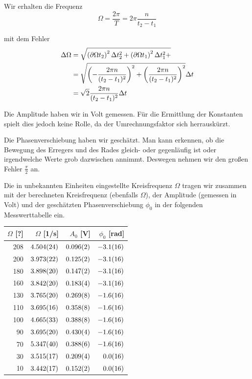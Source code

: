 \documentclass[a4paper,german,12pt,smallheadings]{scrartcl}
\begin{document}
Wir erhalten die Frequenz
\begin{equation}
  \Omega = \frac{2 \pi}{T} = 2 \pi \frac{n}{t_2 - t_1}
\end{equation}

mit dem Fehler
\begin{align}
  \Delta \Omega &= \sqrt{
    \del{\partial{\Omega}{t_2}}^2 \Delta t_2^2 +
    \del{\partial{\Omega}{t_1}}^2 \Delta t_1^2 +
  } \\
  &= \sqrt{
    \del{-\frac{2 \pi n}{(t_2 - t_1)^2}}^2 +
    \del{\frac{2 \pi n}{(t_2 - t_1)^2}}^2
  } \Delta t \\
  &= \sqrt{2} \frac{2 \pi n}{(t_2 - t_1)^2} \Delta t
\end{align}

Die Amplitude haben wir in Volt gemessen. Für die Ermittlung der Konstanten
spielt dies jedoch keine Rolle, da der Umrechnungsfaktor sich herrauskürzt.

Die Phasenverschiebung haben wir geschätzt. Man kann erkennen, ob die Bewegung
des Erregers und des Rades gleich- oder gegenläufig ist oder irgendwelche Werte
grob dazwischen annimmt. Deswegen nehmen wir den großen Fehler $\frac{\pi}{2}$ an.

Die in unbekannten Einheiten eingestellte Kreisfrequenz $\Omega$ tragen wir
zusammen mit der berechneten Kreisfrequenz (ebenfalls $\Omega$), der Amplitude
(gemessen in Volt) und der geschätzten Phasenverschiebung $\phi_0$ in der
folgenden Messwerttabelle ein.

\begin{tabular}{r|r|r|r}
  $\Omega$ [?] & $\Omega$ [1/s] & $A_0$ [V] & $\phi_0$ [rad] \\
  \hline
  208 & $\num{4.504+-0.024}$ & $\num{0.096+-0.002}$ & $\num{-3.1+-1.6}$ \\
  200 & $\num{3.973+-0.022}$ & $\num{0.125+-0.002}$ & $\num{-3.1+-1.6}$ \\
  180 & $\num{3.898+-0.020}$ & $\num{0.147+-0.002}$ & $\num{-3.1+-1.6}$ \\
  160 & $\num{3.842+-0.020}$ & $\num{0.183+-0.004}$ & $\num{-3.1+-1.6}$ \\
  130 & $\num{3.765+-0.020}$ & $\num{0.269+-0.008}$ & $\num{-1.6+-1.6}$ \\
  110 & $\num{3.695+-0.016}$ & $\num{0.358+-0.008}$ & $\num{-1.6+-1.6}$ \\
  100 & $\num{4.665+-0.033}$ & $\num{0.388+-0.008}$ & $\num{-1.6+-1.6}$ \\
  90  & $\num{3.695+-0.020}$ & $\num{0.430+-0.004}$ & $\num{-1.6+-1.6}$ \\
  70  & $\num{5.347+-0.040}$ & $\num{0.388+-0.006}$ & $\num{-1.6+-1.6}$ \\
  30  & $\num{3.515+-0.017}$ & $\num{0.209+-0.004}$ & $\num{ 0.0+-1.6}$ \\
  10  & $\num{3.442+-0.017}$ & $\num{0.152+-0.002}$ & $\num{ 0.0+-1.6}$ \\
\end{tabular}
\end{document}
